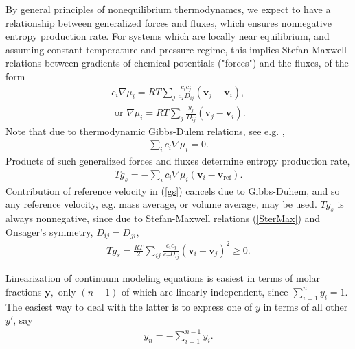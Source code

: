 \documentclass[a4paper, 11 pt]{article}
\theoremstyle{definition}
\theoremstyle{remark}
\newcommand{\dst} {\displaystyle}
\newcommand{\lb} {\left(}
\newcommand{\rb} {\right)}
\newcommand{\bgea}{\begin{equation} \begin{array}{l} }
\newcommand{\enea}{ \end{array} \end{equation}}
\begin{document}
By general principles of nonequilibrium thermodynamcs, we expect to have a relationship between generalized forces and fluxes, which ensures nonnegative entropy production rate. For systems which are locally near equilibrium, and assuming constant temperature and pressure regime, this implies Stefan-Maxwell relations between gradients of chemical potentials ("forces")  and the fluxes, of the form
\bgea
c_i \nabla \mu_i = R  T \dst \sum_j \frac{c_i c_j}{c_T D_{ij}} \lb \mathbf{v}_j - \mathbf{v}_i\rb ,
\\
\mbox{ or }  \nabla \mu_i = R  T \dst \sum_j \frac{ y_j}{D_{ij}} \lb \mathbf{v}_j - \mathbf{v}_i\rb .
\label{SterMax}
\enea
Note that due to thermodynamic Gibbs-Dulem relations, see e.g. \cite{GoyalMonroe},
\bgea
\sum_i c_i \nabla \mu_i = 0.
\enea
Products of such generalized forces and fluxes determine entropy production rate,
\bgea
T g_s = - \sum_i c_i \nabla \mu_i \lb \mathbf{v}_i - \mathbf{v}_{\mbox{ref}} \rb.
\label{gs}
\enea
Contribution of reference velocity in (\ref{gs}) cancels due to Gibbs-Duhem, and so any reference velocity, e.g. mass average, or volume average, may be used. $Tg_s$ is always nonnegative, since due to Stefan-Maxwell relations (\ref{SterMax}) and Onsager's symmetry, $D_{ij}=D_{ji},$
\bgea
T g_s = \frac{R  T}{2} \dst\sum_{ij}  \frac{c_i c_j}{c_T D_{ij}} \lb \mathbf{v}_i -\mathbf{v}_j \rb^2 \geq 0.
\enea

Linearization of continuum modeling equations is easiest in terms of molar fractions $\mathbf{y},$ only $(n-1)$ of which are linearly independent, since $\dst\sum_{i=1}^{n} y_i =1.$ The easiest way to deal with the latter is to express one of $y$ in terms of all other $y'$, say
\bgea
y_n = - \dst\sum_{i=1}^{n-1} y_i.
\enea
\end{document}

